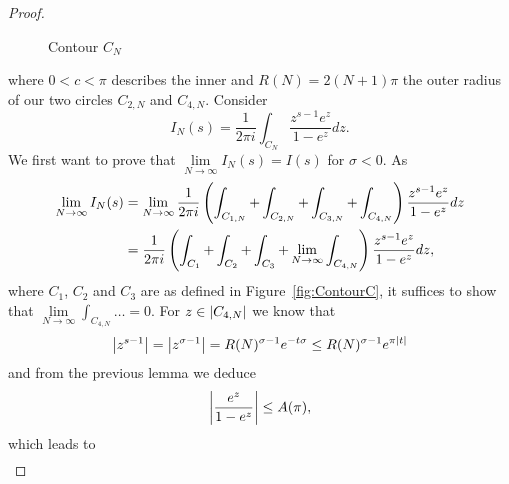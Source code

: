 \begin{proof}
\begin{figure}[!htb]
\begin{minipage}[c]{0.45\textwidth}
\end{minipage}
\caption{Contour $C_N$}
\label{fig:ContourCN}
\end{figure}
	where $0 < c < \pi$ describes the inner and $R(N) = 2(N + 1) \pi$ the outer radius of our two circles $C_{2,N}$ and $C_{4,N}$. Consider
\begin{equation*}
	I_N(s) = \frac{1}{2 \pi i} \int _{C_N} \frac{z^{s - 1} e^z}{1 - e^z} dz.
\end{equation*}
	We first want to prove that $\lim\limits_{N \to \infty} I_N(s) = I(s)$ for $\sigma < 0$. As
\begin{equation*}
\begin{aligned}
	\lim\limits_{N \to \infty} I_N(s)
		&= \lim\limits_{N \to \infty} \frac{1}{2 \pi i} \left(\int_{C_{1,N}} + \int_{C_{2,N}} + \int_{C_{3,N}} + \int_{C_{4,N}}\right) \frac{z^{s - 1} e^z}{1 - e^z} dz \\
		&= \frac{1}{2 \pi i} \left(\int_{C_{1}} + \int_{C_{2}} + \int_{C_{3}} + \lim\limits_{N \to \infty}\int_{C_{4,N}}\right) \frac{z^{s - 1} e^z}{1 - e^z} dz,
\end{aligned}
\end{equation*}
	where $C_1$, $C_2$ and $C_3$ are as defined in Figure~\ref{fig:ContourC}, it suffices to show that $\lim\limits_{N \to \infty} \int _{C_{4,N}} \dots = 0$. For $z \in \left|C_{4,N}\right|$ we know that
\begin{equation*}
	\left|z^{s - 1}\right| = \left|z^{\sigma - 1}\right| = R(N)^{\sigma - 1} e^{-t \sigma} \leq R(N)^{\sigma -1} e^{\pi \left|t\right|}
\end{equation*}
	and from the previous lemma we deduce
\begin{equation*}
	\left|\frac{e^z}{1 - e^z}\right| \leq A(\pi),
\end{equation*}
	which leads to
\begin{equation*}
\begin{aligned}	

\end{aligned}
\end{equation*}
\end{proof}

